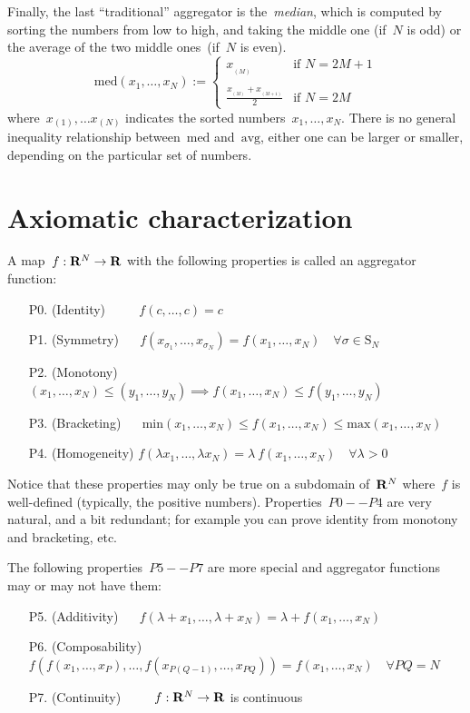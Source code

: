 Finally, the last ``traditional'' aggregator is the~\emph{median},
which is computed by sorting the numbers from low to high, and taking
the middle one (if~$N$ is odd) or the average of the two middle
ones~(if~$N$ is even).
\[
	\mathrm{med}(x_1,\ldots,x_N):=
	\begin{cases}
		x_{{}_{(M)}} & \textrm{if~$N=2M+1$} \\
		&\\
		\displaystyle\frac{x_{{}_{(M)}}
		+ x_{{}_{(M+1)}}}{2}
			& \textrm{if~$N=2M$}
	\end{cases}
\]
where~$x_{(1)},\ldots x_{(N)}$ indicates the sorted
numbers~$x_1,\ldots,x_N$.  There is no general inequality
relationship between~$\mathrm{med}$ and~$\mathrm{avg}$, either one can be larger or
smaller, depending on the particular set of numbers.


\section{Axiomatic characterization}

A map~$f:\mathbf{R}^N\to\mathbf{R}$ with the following properties
is called an aggregator function:
\begin{itemize}
	\item[P0.]
		(Identity)
		$\qquad$
		$f(c,\ldots,c)=c$
	\item[P1.]
		(Symmetry)
		$\quad$
		$f(x_{\sigma_1},\ldots,x_{\sigma_N})=f(x_1,\ldots,x_N)
		\quad
		\forall\sigma\in\mathrm{S}_N$
	\item[P2.]
		(Monotony)
		$\quad$
		$(x_1,\ldots,x_N)\le(y_1,\ldots,y_N)
		\implies
		f(x_1,\ldots,x_N)\le f(y_1,\ldots,y_N)$
	\item[P3.]
		(Bracketing)
		$\quad$
		$\mathrm{min}(x_1,\ldots,x_N)
		\le f(x_1,\ldots,x_N)
		\le \mathrm{max}(x_1,\ldots,x_N)$
	\item[P4.]
		(Homogeneity)
		$f(\lambda x_1,\ldots,\lambda x_N)
		=\lambda\ f(x_1,\ldots,x_N)
		\quad\forall\lambda >0$
\end{itemize}

Notice that these properties may only be true on a subdomain
of~$\mathbf{R}^N$ where~$f$ is well-defined (typically, the positive
numbers).  Properties~$P0--P4$ are very natural, and a bit redundant;
for example you can prove identity from monotony and bracketing, etc.

The following properties~$P5--P7$ are more special and aggregator
functions may or may not have them:

\begin{itemize}
	\item[P5.]
		(Additivity)
		$\quad$
		$f(\lambda+x_1,\ldots,\lambda+x_N)
		=\lambda+f(x_1,\ldots,x_N)$
	\item[P6.]
		(Composability)
		$f\left(f(x_1,\ldots,x_P),\ldots,f(x_{P(Q-1)},\ldots,x_{PQ})\right)
		=f(x_1,\ldots,x_N)\quad\forall PQ=N$
	\item[P7.]
		(Continuity)
		$\qquad$
		$f:\mathbf{R}^N\to\mathbf{R}$ is continuous
\end{itemize}

